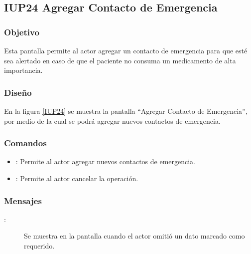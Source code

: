 \subsection{IUP24 Agregar Contacto de Emergencia}
 
\subsubsection{Objetivo}

    Esta pantalla permite al actor agregar un contacto de emergencia para que esté sea alertado en caso de que el paciente no consuma un medicamento de alta importancia.

\subsubsection{Diseño}

    En la figura \ref{IUP24} se muestra la pantalla ``Agregar Contacto de Emergencia'', por medio de la cual se podrá agregar nuevos contactos de emergencia. \\


\subsubsection{Comandos}
\begin{itemize}
    \item {}: Permite al actor agregar nuevos contactos de emergencia.
    \item {}: Permite al actor cancelar la operación.
\end{itemize}

\subsubsection{Mensajes}

\begin{description}
    \item[:] Se muestra en la pantalla  cuando el actor omitió un dato marcado como requerido.

\end{description}
